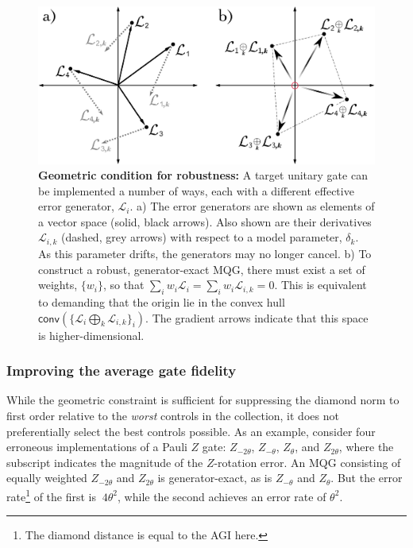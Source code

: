\documentclass[aps,nofootinbib,pra,notitlepage,twocolumn]{revtex4-1}
\newcommand{\genmat}{\ensuremath{{\mathcal{L}}}}
\newcommand{\0}{\ensuremath{\mathbf{0}}}
\newcommand{\weight}{\ensuremath{w}}
\begin{document}
\begin{figure}
  \centering
  \includegraphics[width=\columnwidth]{vectorspace3.png}
  \caption{\textbf{Geometric condition for robustness:}   A target unitary gate can be implemented a number of ways, each with a different effective error generator, $\genmat_i$. a) The error generators are shown as elements of a vector space (solid, black arrows). Also shown are their derivatives $\genmat_{i,k}$ (dashed, grey arrows) with respect to a model parameter, $\delta_k$. As this parameter drifts, the generators may no longer cancel. b) To construct a robust, generator-exact MQG, there must exist a set of weights, $\{\weight_i\}$, so that $\sum_i \weight_i \genmat_i = \sum_i \weight_i \genmat_{i,k} = 0$. This is equivalent to demanding that the origin lie in the convex hull $\mathsf{conv}(\{\genmat_i \bigoplus_k \genmat_{i,k} \}_i)$. The gradient arrows indicate that this space is higher-dimensional. }
  \label{fig:vectorspace2}
\end{figure}



\subsubsection{Improving the average gate fidelity}
\label{sec:norm}
\noindent While the geometric constraint is sufficient for suppressing the diamond norm to first order relative to the \textit{worst} controls in the collection, it does not preferentially select the best controls possible.  As an example, consider four erroneous implementations of a Pauli $Z$ gate: $Z_{-2\theta}$, $Z_{-\theta}$, $Z_{\theta}$, and $Z_{2\theta}$, where the subscript indicates the magnitude of the $Z$-rotation error. An MQG consisting of equally weighted $Z_{-2\theta}$ and $Z_{2\theta}$ is generator-exact, as is $Z_{-\theta}$ and $Z_{\theta}$. But the error rate\footnote{The diamond distance is equal to the AGI here.} of the first is $~4\theta^2$, while the second achieves an error rate of $\theta^2$. 
\end{document}

